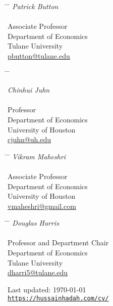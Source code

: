 \documentclass[letterpaper]{article}
\begin{document}
\parbox{0.5\textwidth}{
\begin{tabbing}
\hspace{2.75cm} \= \hspace{4cm} \= \kill
{\textit{Patrick Button }}  \\\\
Associate Professor \\
Department of Economics \\
{Tulane University}\\ 
{\href{mailto:pbutton@tulane.edu}{pbutton@tulane.edu}}
\end{tabbing}}
\hfill
\parbox{0.5\textwidth}{
\begin{tabbing}
\hspace{2.75cm} \= \hspace{4cm} \= \kill

{\textit{Chinhui Juhn }} \\\\
Professor \\
Department of Economics \\
{University of Houston}\\ 
{\href{mailto:cjuhn@uh.edu}{cjuhn@uh.edu}}
\end{tabbing}}
\hfill
\parbox{0.5\textwidth}{ 
\begin{tabbing}
\hspace{2.75cm} \= \hspace{4cm} \= \kill
{\textit{Vikram Maheshri} } \\\\
Associate Professor \\
Department of Economics \\
{University of Houston}\\ 
{\href{mailto:vmaheshri@gmail.com}{vmaheshri@gmail.com}}
\end{tabbing}}
\hfill
\parbox{0.5\textwidth}{ 
\begin{tabbing}
\hspace{2.75cm} \= \hspace{4cm} \= \kill
{\textit{Douglas Harris} } \\\\
Professor and Department Chair \\
Department of Economics \\
{Tulane University}\\ 
{\href{mailto:dharri5@tulane.edu}{dharri5@tulane.edu}}
\end{tabbing}}

\bigskip

\begin{center}
  \begin{footnotesize}
    Last updated: \today \\
    \href{https://hussainhadah.com/cv/}{\texttt{https://hussainhadah.com/cv/}}
  \end{footnotesize}
\end{center}
\end{document}
